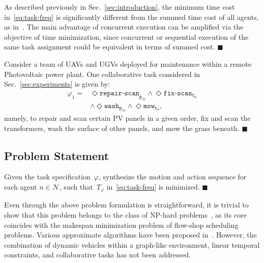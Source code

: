 \begin{remark}\label{rm:cost}
As described previously in Sec.~\ref{sec:introduction}, the minimum time cost in~\eqref{eq:task-freq} is significantly different from the summed time cost of all agents,
as in~\cite{kantaros2020stylus, schillinger2018simultaneous, guo2016task, luo2021temporal}.
The main advantage of concurrent execution can be amplified via
the objective of time minimization,
since concurrent or sequential execution of the same task assignment could
be equivalent in terms of summed cost.
\hfill $\blacksquare$
\end{remark}
\begin{example}\label{exp:task}
Consider a team of UAVs and UGVs deployed for maintenance within a remote Photovoltaic power plant.
One collaborative task considered in Sec.~\ref{sec:experiments} is given by:
\begin{equation}\label{example:task}
\begin{aligned}
\varphi_1 = &\Diamond \texttt{repair-scan}_{\texttt{p}_{31}}
\wedge \Diamond \texttt{fix-scan}_{\texttt{t}_{6}}\\
&\wedge \Diamond \texttt{wash}_{\texttt{p}_{15}}
\wedge \Diamond \texttt{mow}_{\texttt{t}_8},
\end{aligned}
\end{equation}
namely, to repair and scan certain PV panels
in a given order,
fix and scan the transformers,
wash the surface of other panels,
and mow the grass beneath.
 \hfill $\blacksquare$
\end{example}
\subsection{Problem Statement}\label{subsec:problem-statement}

\begin{problem}\label{prob:formulation}
Given the task specification~$\varphi$,
synthesize the motion and action
sequence for each agent $n\in \mathcal{N}$,
such that~$T_{\varphi}$ in~\eqref{eq:task-freq} is minimized.
\hfill $\blacksquare$
\end{problem}

Even through the above problem formulation is straightforward,
it is trivial to show that this problem belongs to the class of NP-hard
problems~\cite{hochba1997approximation, bovet1994introduction},
as its core coincides with the makespan minimization problem
of flow-shop scheduling problems.
Various approximate algorithms have been proposed in~\cite{khamis2015multi, hoos2004stochastic}.
However,
the combination of dynamic vehicles within a graph-like environment,
linear temporal constraints,
and collaborative tasks has not been addressed.
